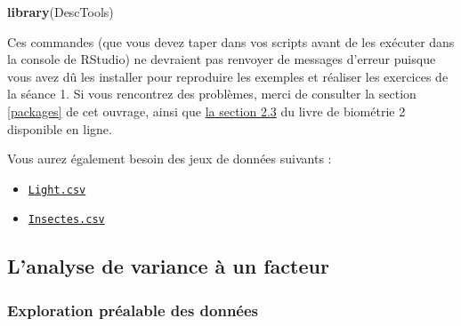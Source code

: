 \documentclass[a4paperpaper,]{article}
\newenvironment{Shaded}{\begin{snugshade}}{\end{snugshade}}
\newcommand{\KeywordTok}[1]{\textcolor[rgb]{0.12,0.11,0.11}{\textbf{#1}}}
\newcommand{\NormalTok}[1]{\textcolor[rgb]{0.12,0.11,0.11}{#1}}
\providecommand{\tightlist}{%
  \setlength{\itemsep}{0pt}\setlength{\parskip}{0pt}}
\begin{document}
\begin{Shaded}
\begin{Highlighting}[]
\KeywordTok{library}\NormalTok{(DescTools)}
\end{Highlighting}
\end{Shaded}

Ces commandes (que vous devez taper dans vos scripts avant de les exécuter dans la console de RStudio) ne devraient pas renvoyer de messages d'erreur puisque vous avez dû les installer pour reproduire les exemples et réaliser les exercices de la séance 1. Si vous rencontrez des problèmes, merci de consulter la section \ref{packages} de cet ouvrage, ainsi que \href{https://besibo.github.io/Biometrie2/bases.html\#charger-un-package-en-memoire}{la section 2.3} du livre de biométrie 2 disponible en ligne.

Vous aurez également besoin des jeux de données suivants :

\begin{itemize}
\tightlist
\item
  \href{https://besibo.github.io/Biometrie3/data/Light.csv}{\texttt{Light.csv}}
\item
  \href{https://besibo.github.io/Biometrie3/data/Insectes.csv}{\texttt{Insectes.csv}}
\end{itemize}

\hypertarget{lanalyse-de-variance-uxe0-un-facteur}{%
\subsection{L'analyse de variance à un facteur}\label{lanalyse-de-variance-uxe0-un-facteur}}

\hypertarget{exploration-pruxe9alable-des-donnuxe9es-1}{%
\subsubsection{Exploration préalable des données}\label{exploration-pruxe9alable-des-donnuxe9es-1}}
\end{document}
